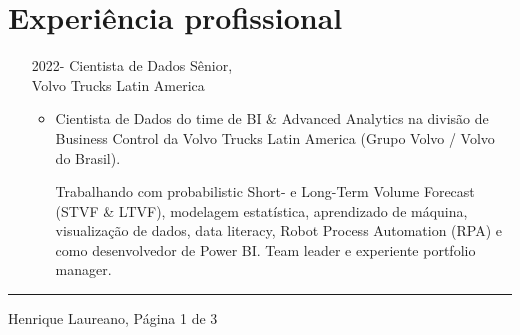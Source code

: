 \documentclass[12pt]{article}
\newcommand{\horrule}[1]{\noindent\rule{\linewidth}{#1}}
\begin{document}
\vspace{-0.5cm}
\section*{Experi\^{e}ncia profissional}

\begin{itemize}
 \item[2022-] Cientista de Dados S\^{e}nior,\\
              Volvo Trucks Latin America
  \begin{itemize}
  \item Cientista de Dados do time de BI \& Advanced Analytics na
        divis\~{a}o de Business Control da Volvo Trucks Latin America (Grupo 
        Volvo / Volvo do Brasil).
        
        Trabalhando com probabilistic Short- e Long-Term Volume Forecast 
        (STVF \& LTVF), modelagem estat\'{i}stica, aprendizado de m\'{a}quina,
        visualiza\c{c}\~{a}o de dados, data literacy, Robot Process Automation 
        (RPA) e como desenvolvedor de Power BI. Team leader e experiente 
        portfolio manager.
  \end{itemize}
\end{itemize}

\vspace{\fill}
\horrule{1pt}
\noindent Henrique Laureano, \hfill P\'{a}gina 1 de 3
\end{document}

